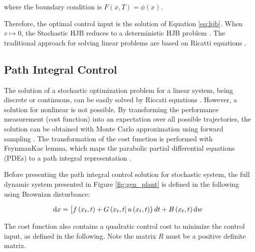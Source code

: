 \documentclass[]{hdsr}
\begin{document}
where the boundary condition is $F(x,T) = \phi(x)$.

Therefore, the optimal control input is the solution of Equation \ref{eq:hjb}. When $v \longmapsto 0$, the Stochastic HJB reduces to a deterministic HJB problem \citep{kappen2011optimal}. The traditional approach for solving linear problems are based on Ricatti equations \citep{kirk2004optimal}.

\subsection{Path Integral Control} \label{se:path} The solution of a stochastic optimization problem for a linear system, being discrete or continuous, can be easily solved by Riccati equations \citep{kirk2004optimal}. However, a solution for nonlinear is not possible. By transforming the performance measurement (cost function) into an expectation over all possible trajectories, the solution can be obtained with Monte Carlo approximation using forward sampling \citep{kappen2005path}. The transformation of the cost function is performed with FeynmanKac lemma, which maps the parabolic partial differential equations (PDEs) to a path integral representation \citep{theodorou2010generalized}. 

Before presenting the path integral control solution for stochastic system, the full dynamic system presented in Figure \ref{fig:gen_plant} is defined in the following using Brownian disturbance:


\begin{equation}
\dif x=\left[f\left(x_{t}, t\right)+G\left(x_{t}, t\right] u\left(x_{t}, t\right)\right) d t+B\left(x_{t}, t\right) \dif w
\end{equation}

The cost function also contains a quadratic control cost to minimize the control input, as defined in the following. Note the matrix $R$ must be a positive definite matrix.
\end{document}
